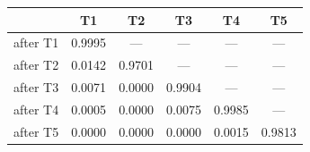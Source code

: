 \begin{tabular}{@{}lccccc@{}}
\toprule
& \textbf{T1} & \textbf{T2} & \textbf{T3} & \textbf{T4} & \textbf{T5} \\
\midrule
after T1 & 0.9995 & --- & --- & --- & --- \\
after T2 & 0.0142 & 0.9701 & --- & --- & --- \\
after T3 & 0.0071 & 0.0000 & 0.9904 & --- & --- \\
after T4 & 0.0005 & 0.0000 & 0.0075 & 0.9985 & --- \\
after T5 & 0.0000 & 0.0000 & 0.0000 & 0.0015 & 0.9813 \\
\bottomrule
\end{tabular}
